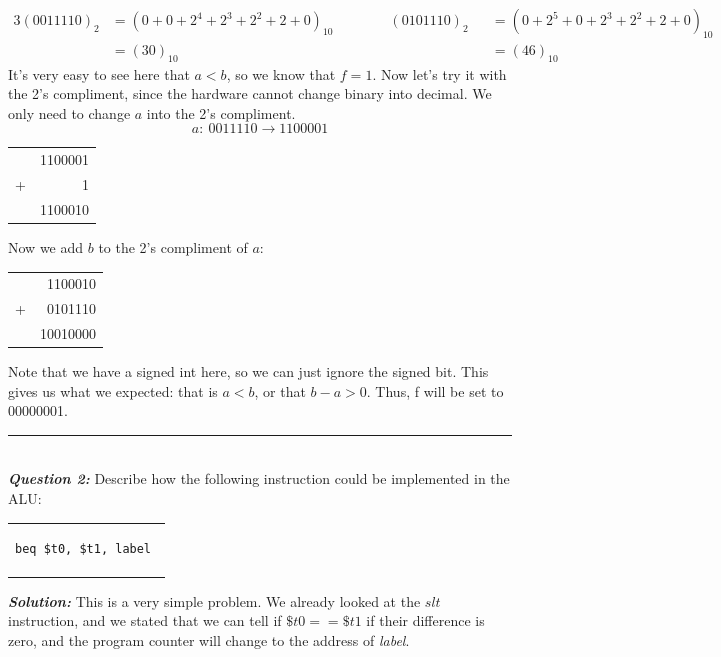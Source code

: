 \documentclass{article}
\begin{document}
\begin{alignat*}{3}
(0011110)_{2} &= (0 + 0 + 2^{4} + 2^{3} + 2^{2} + 2 + 0)_{10} \qquad\qquad (0101110)_{2} &&= (0 + 2^{5} + 0 + 2^{3} + 2^{2} + 2 + 0)_{10}\\
&= (30)_{10} &&= (46)_{10}
\end{alignat*}
\noindent It's very easy to see here that $a < b$, so we know that $f = 1$. Now let's try it with the 2's compliment, since the hardware cannot change binary into decimal. We only need to change $a$ into the 2's compliment.
\[a:\ 0011110 \to 1100001\]
\begin{center}
\begin{tabular}{c r}
& 1100001 \\
+ & 1 \\ \hline
& 1100010
\end{tabular}
\end{center}
\noindent Now we add $b$ to the 2's compliment of $a$:
\begin{center}
\begin{tabular}{c r}
& 1100010 \\
+ & 0101110 \\ \hline
& 10010000
\end{tabular}
\end{center}
\noindent Note that we have a signed int here, so we can just ignore the signed bit. This gives us what we expected: that is $a < b$, or that $b - a > 0$. Thus, f will be set to 00000001.\\
\hrule
\noindent\\ 


\indent \textit{\textbf{Question 2:}} Describe how the following instruction could be implemented in the ALU:
\begin{center}
\begin{tabular}{c}
\begin{lstlisting}
beq $t0, $t1, label 
\end{lstlisting}
\end{tabular}
\end{center}
\noindent \textit{\textbf{Solution:}} This is a very simple problem. We already looked at the $slt$ instruction, and we stated that we can tell if $\$t0 == \$t1$ if their difference is zero, and the program counter will change to the address of \textit{label}.
\end{document}
